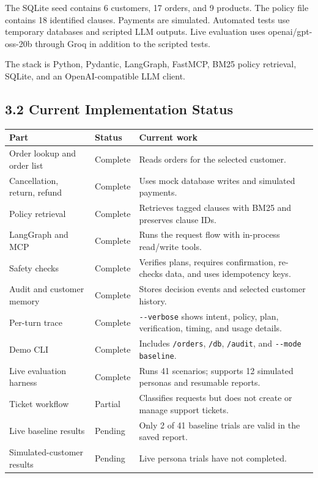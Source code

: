 \documentclass[11pt,a4paper]{article}
\begin{document}
The SQLite seed contains 6 customers, 17 orders, and 9 products. The policy file contains 18 identified clauses. Payments are simulated. Automated tests use temporary databases and scripted LLM outputs. Live evaluation uses openai/gpt-oss-20b through Groq in addition to the scripted tests.

The stack is Python, Pydantic, LangGraph, FastMCP, BM25 policy retrieval, SQLite, and an OpenAI-compatible LLM client.

\subsection*{3.2 Current Implementation Status}

\begin{center}
\small
\begin{tabular}{p{}p{}p{}}
\toprule
\textbf{Part} & \textbf{Status} & \textbf{Current work} \\
\midrule
Order lookup and order list & Complete & Reads orders for the selected customer. \\
Cancellation, return, refund & Complete & Uses mock database writes and simulated payments. \\
Policy retrieval & Complete & Retrieves tagged clauses with BM25 and preserves clause IDs. \\
LangGraph and MCP & Complete & Runs the request flow with in-process read/write tools. \\
Safety checks & Complete & Verifies plans, requires confirmation, re-checks data, and uses idempotency keys. \\
Audit and customer memory & Complete & Stores decision events and selected customer history. \\
Per-turn trace & Complete & \texttt{-\kern0pt-verbose} shows intent, policy, plan, verification, timing, and usage details. \\
Demo CLI & Complete & Includes \texttt{/orders}, \texttt{/db}, \texttt{/audit}, and \texttt{-\kern0pt-mode baseline}. \\
Live evaluation harness & Complete & Runs 41 scenarios; supports 12 simulated personas and resumable reports. \\
Ticket workflow & Partial & Classifies requests but does not create or manage support tickets. \\
Live baseline results & Pending & Only 2 of 41 baseline trials are valid in the saved report. \\
Simulated-customer results & Pending & Live persona trials have not completed. \\
\bottomrule
\end{tabular}
\end{center}
\end{document}

